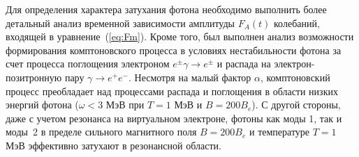 Для определения характера затухания фотона необходимо выполнить более детальный анализ временной зависимости амплитуды $F_A(t)$ колебаний, входящей в уравнение~(\ref{eq:Fm}). Кроме того, был выполнен анализ возможности формирования комптоновского процесса в условиях нестабильности фотона за счет процесса поглощения электроном $e^\pm\gamma\to e^\pm$ и распада на электрон-позитронную пару $\gamma\to e^+e^-$. Несмотря на малый фактор $\alpha$, комптоновский процесс преобладает над процессами распада и поглощения в области низких энергий фотона ($\omega<3$ МэВ при $T=1$ МэВ и $B =200B_e$). С другой стороны, даже с учетом резонанса на виртуальном электроне, фотоны как моды 1, так и моды~2 в пределе сильного магнитного поля $B=200 B_e$ и температуре $T=1$ МэВ эффективно затухают в резонансной области.

